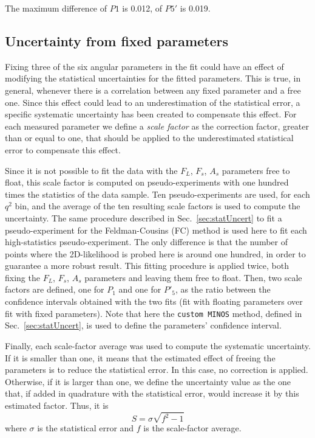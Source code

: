 The maximum difference of $P1$ is 0.012, of $P5'$ is 0.019.

\subsection{Uncertainty from fixed \pdf parameters}
\label{sec:sys-fixedparm}

Fixing three of the six angular parameters in the fit could have an effect of modifying the statistical uncertainties for the fitted parameters.
This is true, in general, whenever there is a correlation between any fixed parameter and a free one.
Since this effect could lead to an underestimation of the statistical error, a specific systematic uncertainty has been created to compensate this effect.
For each measured parameter we define a \textit{scale factor} as the correction factor, greater than or equal to one, that should be applied to the underestimated statistical error to compensate this effect. 


Since it is not possible to fit the data with the $F_L$, $F_s$, $A_s$ parameters free to float, this scale factor is computed on pseudo-experiments with one hundred times the statistics of the data sample.
Ten pseudo-experiments are used, for each $q^2$ bin, and the average of the ten resulting scale factors is used to compute the uncertainty.
The same procedure described in Sec.~\ref{sec:statUncert} to fit a pseudo-experiment for the Feldman-Cousins (FC) method is used here to fit each high-statistics pseudo-experiment.
The only difference is that the number of points where the 2D-likelihood is probed here is around one hundred, in order to guarantee a more robust result.
This fitting procedure is applied twice, both fixing the $F_L$, $F_s$, $A_s$ parameters and leaving them free to float.
Then, two scale factors are defined, one for $P_1$ and one for $P'_5$, as the ratio between the confidence intervals obtained with the two fits (fit with floating parameters over fit with fixed parameters).
Note that here the {\tt custom MINOS} method, defined in Sec.~\ref{sec:statUncert}, is used to define the parameters' confidence interval.

Finally, each scale-factor average was used to compute the systematic uncertainty.
If it is smaller than one, it means that the estimated effect of freeing the parameters is to reduce the statistical error.
In this case, no correction is applied.
Otherwise, if it is larger than one, we define the uncertainty value as the one that, if added in quadrature with the statistical error, would increase it by this estimated factor.
Thus, it is
\begin{equation} \label{eq:fix.syst.def}
S = \sigma \sqrt{f^2-1}
\end{equation}
where $\sigma$ is the statistical error and $f$ is the scale-factor average.

